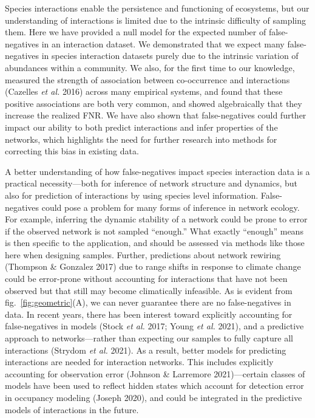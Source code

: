\documentclass[11pt]{article}
\begin{document}
Species interactions enable the persistence and functioning of
ecosystems, but our understanding of interactions is limited due to the
intrinsic difficulty of sampling them. Here we have provided a null
model for the expected number of false-negatives in an interaction
dataset. We demonstrated that we expect many false-negatives in species
interaction datasets purely due to the intrinsic variation of abundances
within a community. We also, for the first time to our knowledge,
measured the strength of association between co-occurrence and
interactions (Cazelles \emph{et al.} 2016) across many empirical
systems, and found that these positive associations are both very
common, and showed algebraically that they increase the realized FNR. We
have also shown that false-negatives could further impact our ability to
both predict interactions and infer properties of the networks, which
highlights the need for further research into methods for correcting
this bias in existing data.

A better understanding of how false-negatives impact species interaction
data is a practical necessity---both for inference of network structure
and dynamics, but also for prediction of interactions by using species
level information. False-negatives could pose a problem for many forms
of inference in network ecology. For example, inferring the dynamic
stability of a network could be prone to error if the observed network
is not sampled ``enough.'' What exactly ``enough'' means is then
specific to the application, and should be assessed via methods like
those here when designing samples. Further, predictions about network
rewiring (Thompson \& Gonzalez 2017) due to range shifts in response to
climate change could be error-prone without accounting for interactions
that have not been observed but that still may become climatically
infeasible. As is evident from fig.~\ref{fig:geometric}(A), we can never
guarantee there are no false-negatives in data. In recent years, there
has been interest toward explicitly accounting for false-negatives in
models (Stock \emph{et al.} 2017; Young \emph{et al.} 2021), and a
predictive approach to networks---rather than expecting our samples to
fully capture all interactions (Strydom \emph{et al.} 2021). As a
result, better models for predicting interactions are needed for
interaction networks. This includes explicitly accounting for
observation error (Johnson \& Larremore 2021)---certain classes of
models have been used to reflect hidden states which account for
detection error in occupancy modeling (Joseph 2020), and could be
integrated in the predictive models of interactions in the future.
\end{document}
